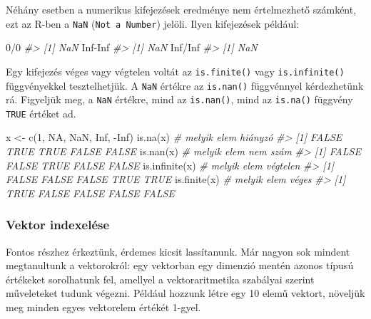 \documentclass[
]{book}
\newenvironment{Shaded}{\begin{snugshade}}{\end{snugshade}}
\newcommand{\CommentTok}[1]{\textcolor[rgb]{0.56,0.35,0.01}{\textit{#1}}}
\newcommand{\ConstantTok}[1]{\textcolor[rgb]{0.00,0.00,0.00}{#1}}
\newcommand{\DecValTok}[1]{\textcolor[rgb]{0.00,0.00,0.81}{#1}}
\newcommand{\FunctionTok}[1]{\textcolor[rgb]{0.00,0.00,0.00}{#1}}
\newcommand{\NormalTok}[1]{#1}
\newcommand{\OtherTok}[1]{\textcolor[rgb]{0.56,0.35,0.01}{#1}}
\newcommand{\SpecialCharTok}[1]{\textcolor[rgb]{0.00,0.00,0.00}{#1}}
\begin{document}
Néhány esetben a numerikus kifejezések eredménye nem értelmezhető számként, ezt az R-ben a \texttt{NaN} (\texttt{Not\ a\ Number}) jelöli. Ilyen kifejezések például:

\begin{Shaded}
\begin{Highlighting}[]
\DecValTok{0}\SpecialCharTok{/}\DecValTok{0}
\CommentTok{\#\textgreater{} [1] NaN}
\ConstantTok{Inf}\SpecialCharTok{{-}}\ConstantTok{Inf}
\CommentTok{\#\textgreater{} [1] NaN}
\ConstantTok{Inf}\SpecialCharTok{/}\ConstantTok{Inf}
\CommentTok{\#\textgreater{} [1] NaN}
\end{Highlighting}
\end{Shaded}

Egy kifejezés véges vagy végtelen voltát az \texttt{is.finite()} vagy \texttt{is.infinite()} függvényekkel tesztelhetjük. A \texttt{NaN} értékre az \texttt{is.nan()} függvénnyel kérdezhetünk rá. Figyeljük meg, a \texttt{NaN} értékre, mind az \texttt{is.nan()}, mind az \texttt{is.na()} függvény \texttt{TRUE} értéket ad.

\begin{Shaded}
\begin{Highlighting}[]
\NormalTok{x }\OtherTok{\textless{}{-}} \FunctionTok{c}\NormalTok{(}\DecValTok{1}\NormalTok{, }\ConstantTok{NA}\NormalTok{, }\ConstantTok{NaN}\NormalTok{, }\ConstantTok{Inf}\NormalTok{, }\SpecialCharTok{{-}}\ConstantTok{Inf}\NormalTok{)}
\FunctionTok{is.na}\NormalTok{(x)           }\CommentTok{\# melyik elem hiányzó}
\CommentTok{\#\textgreater{} [1] FALSE  TRUE  TRUE FALSE FALSE}
\FunctionTok{is.nan}\NormalTok{(x)          }\CommentTok{\# melyik elem nem szám}
\CommentTok{\#\textgreater{} [1] FALSE FALSE  TRUE FALSE FALSE}
\FunctionTok{is.infinite}\NormalTok{(x)     }\CommentTok{\# melyik elem végtelen}
\CommentTok{\#\textgreater{} [1] FALSE FALSE FALSE  TRUE  TRUE}
\FunctionTok{is.finite}\NormalTok{(x)       }\CommentTok{\# melyik elem véges}
\CommentTok{\#\textgreater{} [1]  TRUE FALSE FALSE FALSE FALSE}
\end{Highlighting}
\end{Shaded}

\hypertarget{vektor-indexeluxe9se}{%
\subsubsection{Vektor indexelése}\label{vektor-indexeluxe9se}}

Fontos részhez érkeztünk, érdemes kicsit lassítanunk. Már nagyon sok mindent megtanultunk a vektorokról: egy vektorban egy dimenzió mentén azonos típusú értékeket sorolhatunk fel, amellyel a vektoraritmetika szabályai szerint műveleteket tudunk végezni. Például hozzunk létre egy 10 elemű vektort, növeljük meg minden egyes vektorelem értékét 1-gyel.
\end{document}
